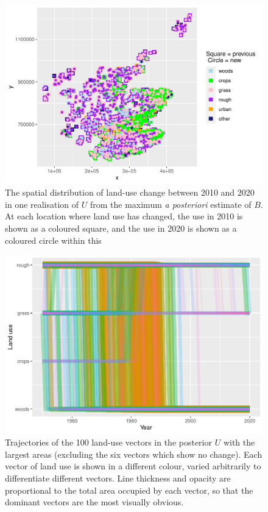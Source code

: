 \documentclass[
]{book}
\begin{document}
\begin{figure}
\centering
\includegraphics{Results_sc_files/figure-latex/plotUd-1.pdf}
\caption{\label{fig:plotUd}The spatial distribution of land-use change between 2010 and 2020 in one realisation of \(U\) from the maximum \emph{a posteriori} estimate of \(B\). At each location where land use has changed, the use in 2010 is shown as a coloured square, and the use in 2020 is shown as a coloured circle within this}
\end{figure}

\begin{figure}
\centering
\includegraphics{Results_sc_files/figure-latex/plotv1-1.pdf}
\caption{\label{fig:plotv1}Trajectories of the 100 land-use vectors in the posterior \(U\) with the largest areas (excluding the six vectors which show no change). Each vector of land use is shown in a different colour, varied arbitrarily to differentiate different vectors. Line thickness and opacity are proportional to the total area occupied by each vector, so that the dominant vectors are the most visually obvious.}
\end{figure}
\end{document}
